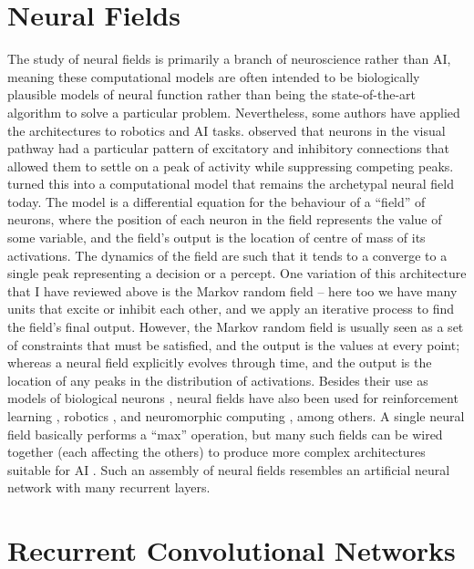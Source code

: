 \documentclass[11pt, a4paper, openany]{book}
\newcommand{\nquote}[1]{``{#1}''}
\begin{document}
\section{Neural Fields}

The study of neural fields is primarily a branch of neuroscience rather than AI, meaning these computational models are often intended to be biologically plausible models of neural function rather than being the state-of-the-art algorithm to solve a particular problem. Nevertheless, some authors have applied the architectures to robotics and AI tasks. \citet{ellias1975pattern} observed that neurons in the visual pathway had a particular pattern of excitatory and inhibitory connections that allowed them to settle on a peak of activity while suppressing competing peaks. \citet{amari1977dynamics} turned this into a computational model that remains the archetypal neural field today. The model is a differential equation for the behaviour of a \nquote{field} of neurons, where the position of each neuron in the field represents the value of some variable, and the field's output is the location of centre of mass of its activations. The dynamics of the field are such that it tends to a converge to a single peak representing a decision or a percept. One variation of this architecture that I have reviewed above is the Markov random field -- here too we have many units that excite or inhibit each other, and we apply an iterative process to find the field's final output. However, the Markov random field is usually seen as a set of constraints that must be satisfied, and the output is the values at every point; whereas a neural field explicitly evolves through time, and the output is the location of any peaks in the distribution of activations. Besides their use as models of biological neurons \citep{kopecz1995saccadic,ermentrout1998neural,brincat2006dynamic,sandamirskaya2010embodied}, neural fields have also been used for reinforcement learning \citep{dnfreinforcement}, robotics \citep{dnfrobots2,dnfrobots3,dnfrobots}, and neuromorphic computing \citep{dnfneuromorphic}, among others. A single neural field basically performs a \nquote{max} operation, but many such fields can be wired together (each affecting the others) to produce more complex architectures suitable for AI \citep{dnfneuromorphic}. Such an assembly of neural fields resembles an artificial neural network with many recurrent layers.

\section{Recurrent Convolutional Networks}
\end{document}
